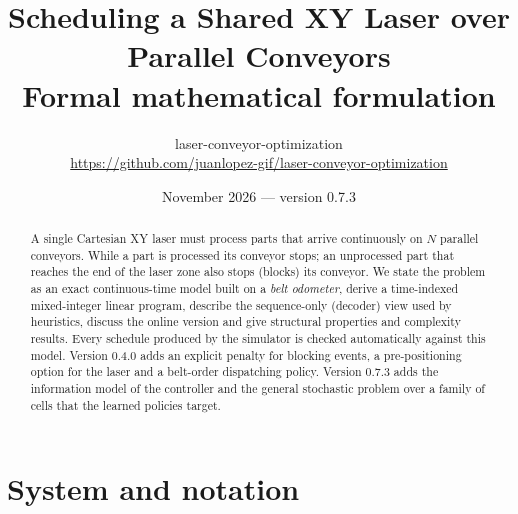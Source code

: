 \documentclass[11pt,a4paper]{article}
\title{\textbf{Scheduling a Shared XY Laser over Parallel Conveyors}\\[0.3em]
\large Formal mathematical formulation}
\author{laser-conveyor-optimization\\\small\url{https://github.com/juanlopez-gif/laser-conveyor-optimization}}
\date{November 2026 --- version 0.7.3}
\theoremstyle{definition}
\theoremstyle{remark}
\begin{document}
\maketitle

\begin{abstract}
A single Cartesian XY laser must process parts that arrive continuously on $N$
parallel conveyors. While a part is processed its conveyor stops; an unprocessed part
that reaches the end of the laser zone also stops (blocks) its conveyor. We state the
problem as an exact continuous-time model built on a \emph{belt odometer}, derive a
time-indexed mixed-integer linear program, describe the sequence-only (decoder) view
used by heuristics, discuss the online version and give structural properties and
complexity results. Every schedule produced by the simulator is checked automatically
against this model. Version 0.4.0 adds an explicit penalty for blocking events, a
pre-positioning option for the laser and a belt-order dispatching policy. Version 0.7.3
adds the information model of the controller and the general stochastic problem over a
family of cells that the learned policies target.
\end{abstract}

\tableofcontents
\bigskip

\section{System and notation}
\end{document}

